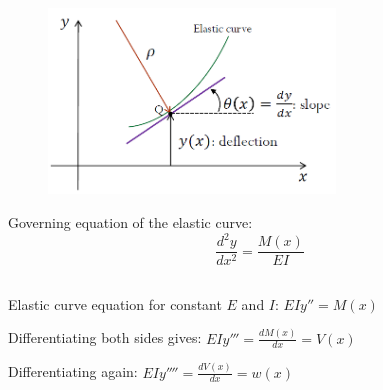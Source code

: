 \begin{figure}[!h]
\centering
\includegraphics[angle=0, width=3in]{Beam Deflection-Figures/ElasticCurveGraph.png}
\vspace{-2mm}
\caption{\small {}}
\vspace{-3mm}
\label{Fig:ElasticCurvegraph}
\end{figure}

\noindent Governing equation of the elastic curve:
\[\frac{d^2y}{dx^2} = \frac{M(x)}{EI}\]




\subsubsection{}


\subsection{}

\noindent Elastic curve equation for constant $E$ and $I$: $EIy'' = M(x)$

\vspace{5pt}

\noindent Differentiating both sides gives: $EIy''' = \frac{dM(x)}{dx} = V(x)$

\vspace{5pt}

\noindent Differentiating again: $EIy'''' = \frac{dV(x)}{dx} = w(x)$ 

\vspace{5pt}

